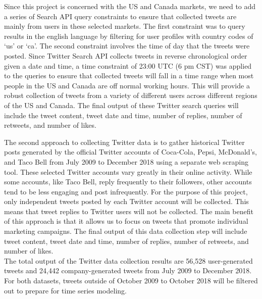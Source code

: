 \documentclass[12pt,oneside]{chicagocapstone}
\begin{document}
Since this project is concerned with the US and Canada markets, we need to add a series of Search API query constraints to ensure that collected tweets are mainly from users in these selected markets. The first constraint was to query results in the english language by filtering for user profiles with country codes of `us' or `ca'. The second constraint involves the time of day that the tweets were posted. Since Twitter Search API collects tweets in reverse chronological order given a date and time, a time constraint of 23:00 UTC (6 pm CST) was applied to the queries to ensure that collected tweets will fall in a time range when most people in the US and Canada are off normal working hours. This will provide a robust collection of tweets from a variety of different users across different regions of the US and Canada. The final output of these Twitter search queries will include the tweet content, tweet date and time, number of replies, number of retweets, and number of likes.

The second approach to collecting Twitter data is to gather historical Twitter posts generated by the official Twitter accounts of Coca-Cola, Pepsi, McDonald's, and Taco Bell from July 2009 to December 2018 using a separate web scraping tool. These selected Twitter accounts vary greatly in their online activity. While some accounts, like Taco Bell, reply frequently to their followers, other accounts tend to be less engaging and post infrequently. For the purpose of this project, only independent tweets posted by each Twitter account will be collected. This means that tweet replies to Twitter users will not be collected. The main benefit of this approach is that it allows us to focus on tweets that promote individual marketing campaigns. The final output of this data collection step will include tweet content, tweet date and time, number of replies, number of retweets, and number of likes.\\
The total output of the Twitter data collection results are 56,528 user-generated tweets and 24,442 company-generated tweets from July 2009 to December 2018. For both datasets, tweets outside of October 2009 to October 2018 will be filtered out to prepare for time series modeling.
\end{document}
